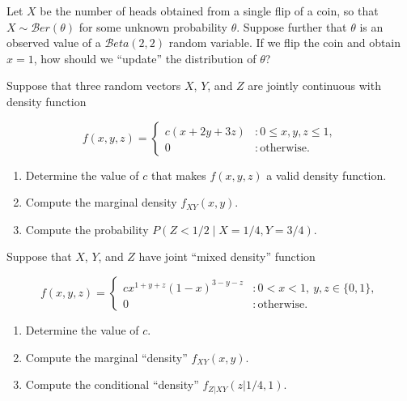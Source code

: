 \documentclass[12pt,reqno]{amsart}
\begin{document}
\bigskip
\prob Let $X$ be the number of heads obtained from a single flip of a coin, so that $X\sim \mathcal{B}er(\theta)$ for some unknown probability $\theta$. Suppose further that $\theta$ is an observed value of a $\mathcal{B}eta(2,2)$ random variable. If we flip the coin and obtain $x=1$, how should we ``update'' the distribution of $\theta$?\vfill













\newpage
\prob Suppose that three random vectors $X$, $Y$, and $Z$ are jointly continuous with density function

	\[
	f(x,y,z) = \begin{cases}
	c(x+2y+3z) & : 0\leq x, y, z \leq 1, \\
	0 & : \text{otherwise}.
	\end{cases}
	\]

\medskip
\begin{enumerate}
\item Determine the value of $c$ that makes $f(x,y,z)$ a valid density function.\vfill
\item Compute the marginal density $f_{XY}(x,y)$.\vfill
\item Compute the probability $P\left( Z < 1/2 \mid X = 1/4,  Y = 3/4 \right)$.\vfill
\end{enumerate}









\bigskip
\prob Suppose that $X$, $Y$, and $Z$ have joint ``mixed density'' function

	\[
	f(x,y,z) = \begin{cases}
	c x^{1+y+z} ( 1-x)^{3-y-z} & : 0 < x< 1, \ y,z\in \{0,1\}, \\
	0 & : \text{otherwise}.
	\end{cases}
	\]
	
\medskip
\begin{enumerate}
\item Determine the value of $c$.\vfill
\item Compute the marginal ``density'' $f_{XY}(x,y)$.\vfill
\item Compute the conditional ``density'' $f_{Z|XY}(z|1/4, 1)$.\vfill
\end{enumerate}
\end{document}
